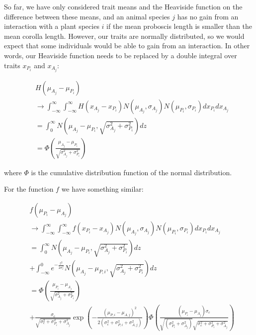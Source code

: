 \documentclass[a4paper,12pt]{article}
\begin{document}
So far, we have only considered trait means and the Heaviside function on the difference between these means, and an animal species $j$ has no gain from an interaction with a plant species $i$ if the mean proboscis length is smaller than the mean corolla length. However, our traits are normally distributed, so we would expect that some individuals would be able to gain from an interaction. In other words, our Heaviside function needs to be replaced by a double integral over traits $x_{P_i}$ and $x_{A_j}$:

\begin{align}
    & H(\mu_{A_j} - \mu_{P_i})  \\
    &\rightarrow \int^{\infty}_{-\infty} \int^{\infty}_{-\infty} H(x_{A_j} - x_{P_i}) N(\mu_{A_j},\sigma_{A_j}) N(\mu_{P_i},\sigma_{P_i}) dx_{P_i} dx_{A_j} \\
    &= \int^{\infty}_0 N(\mu_{A_j} - \mu_{P_i},\sqrt{\sigma^2_{A_j} + \sigma^2_{P_i}}) dz \\ 
    &= \Phi\!\left(\frac{\mu_{A_j}-\mu_{P_i}}{\sqrt{\sigma_{A_j}^2+\sigma_{P_i}^2}}\right)
\end{align}


\noindent where $\Phi$ is the cumulative distribution function of the normal distribution. 


For the function $f$ we have something similar:

\begin{align}
    &f(\mu_{P_i} - \mu_{A_j}) \\
    &\rightarrow \int^{\infty}_{-\infty} \int^{\infty}_{-\infty} f(x_{P_i} - x_{A_j}) N(\mu_{A_j},\sigma_{A_j}) N(\mu_{P_i},\sigma_{P_i}) dx_{P_i} dx_{A_j} \\
    &= \int^{\infty}_0 N(\mu_{A_j} - \mu_{P_i},\sqrt{\sigma^2_{A_j} +   \sigma^2_{P_i}}) dz \\
    &+ \int^0_{-\infty} e^{-\frac{z^2}{2 \sigma_c^2}} N(\mu_{A_j} - \mu_{P,i},\sqrt{\sigma^2_{A_j} + \sigma^2_{P_i}})dz \\
    &= \Phi\!\left(\frac{\mu_{P_i}-\mu_{A_j}}{\sqrt{\sigma_{A_j}^2+\sigma_{P_i}^2}}\right) \\
    &+ \frac{\sigma_c}{\sqrt{\sigma_c^2+\sigma_{P_i}^2+\sigma_{A_j}^2}} \exp\!\left(
-\frac{(\mu_{P,i}-\mu_{A,j})^2}{2(\sigma_c^2+\sigma_{P,i}^2+\sigma_{A,j}^2)}
\right)
\Phi\!\left(
\frac{(\mu_{P_i}-\mu_{A_j}) \sigma_c}
{\sqrt{(\sigma_{P_i}^2+\sigma_{A_j}^2)}\sqrt{\sigma_c^2+\sigma_{P_i}^2+\sigma_{A_j}^2}}
\right)
\end{align}
\end{document}
